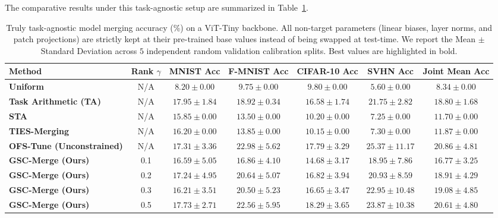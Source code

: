 The comparative results under this task-agnostic setup are summarized in Table~\ref{tab:results_ta}.

\begin{table}[t]
\caption{Truly task-agnostic model merging accuracy (\%) on a ViT-Tiny backbone. All non-target parameters (linear biases, layer norms, and patch projections) are strictly kept at their pre-trained base values instead of being swapped at test-time. We report the Mean $\pm$ Standard Deviation across $5$ independent random validation calibration splits. Best values are highlighted in bold.}
\label{tab:results_ta}
\vskip 0.15in
\begin{center}
\begin{small}
\begin{sc}
\setlength{\tabcolsep}{2.5pt}
\begin{tabular}{lcccccc}
\toprule
Method & Rank $\gamma$ & MNIST Acc & F-MNIST Acc & CIFAR-10 Acc & SVHN Acc & Joint Mean Acc \\
\midrule
\textbf{Uniform} & N/A & $8.20 \pm 0.00$ & $9.75 \pm 0.00$ & $9.80 \pm 0.00$ & $5.60 \pm 0.00$ & $8.34 \pm 0.00$ \\
\textbf{Task Arithmetic (TA)} & N/A & $\mathbf{17.95 \pm 1.84}$ & $18.92 \pm 0.34$ & $16.58 \pm 1.74$ & $21.75 \pm 2.82$ & $18.80 \pm 1.68$ \\
\textbf{STA} & N/A & $15.85 \pm 0.00$ & $13.50 \pm 0.00$ & $10.20 \pm 0.00$ & $7.25 \pm 0.00$ & $11.70 \pm 0.00$ \\
\textbf{TIES-Merging} & N/A & $16.20 \pm 0.00$ & $13.85 \pm 0.00$ & $10.15 \pm 0.00$ & $7.30 \pm 0.00$ & $11.87 \pm 0.00$ \\
\textbf{OFS-Tune (Unconstrained)} & N/A & $17.31 \pm 3.36$ & $\mathbf{22.98 \pm 5.62}$ & $17.79 \pm 3.29$ & $\mathbf{25.37 \pm 11.17}$ & $\mathbf{20.86 \pm 4.81}$ \\
\midrule
\textbf{GSC-Merge (Ours)} & 0.1 & $16.59 \pm 5.05$ & $16.86 \pm 4.10$ & $14.68 \pm 3.17$ & $18.95 \pm 7.86$ & $16.77 \pm 3.25$ \\
\textbf{GSC-Merge (Ours)} & 0.2 & $17.24 \pm 4.95$ & $20.64 \pm 5.07$ & $16.82 \pm 3.94$ & $20.93 \pm 8.59$ & $18.91 \pm 4.29$ \\
\textbf{GSC-Merge (Ours)} & 0.3 & $16.21 \pm 3.51$ & $20.50 \pm 5.23$ & $16.65 \pm 3.47$ & $22.95 \pm 10.48$ & $19.08 \pm 4.85$ \\
\textbf{GSC-Merge (Ours)} & 0.5 & $17.73 \pm 2.71$ & $22.56 \pm 5.95$ & $\mathbf{18.29 \pm 3.65}$ & $23.87 \pm 10.38$ & $20.61 \pm 4.80$ \\
\bottomrule
\end{tabular}
\end{sc}
\end{small}
\end{center}
\vskip -0.1in
\end{table}

